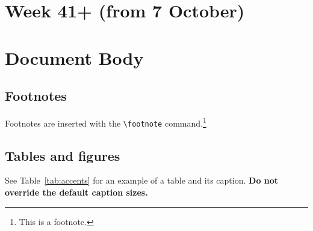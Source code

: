 \documentclass[11pt]{article}
\begin{document}
\section{Week 41+ (from 7 October)}


\section{Document Body}

\subsection{Footnotes}

Footnotes are inserted with the \verb|\footnote| command.\footnote{This is a footnote.}

\subsection{Tables and figures}

See Table~\ref{tab:accents} for an example of a table and its caption.
\textbf{Do not override the default caption sizes.}
\end{document}
